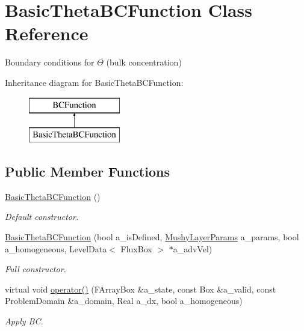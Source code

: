\hypertarget{class_basic_theta_b_c_function}{\section{Basic\-Theta\-B\-C\-Function Class Reference}
\label{class_basic_theta_b_c_function}
}


Boundary conditions for $ \Theta $ (bulk concentration)  


Inheritance diagram for Basic\-Theta\-B\-C\-Function\-:\begin{figure}[H]
\begin{center}
\leavevmode
\includegraphics[height=2.000000cm]{class_basic_theta_b_c_function}
\end{center}
\end{figure}
\subsection*{Public Member Functions}
\begin{DoxyCompactItemize}
\item 
\hypertarget{class_basic_theta_b_c_function_a53435ce6441cb3cdf5eec5d337f93a9a}{\hyperlink{class_basic_theta_b_c_function_a53435ce6441cb3cdf5eec5d337f93a9a}{Basic\-Theta\-B\-C\-Function} ()}\label{class_basic_theta_b_c_function_a53435ce6441cb3cdf5eec5d337f93a9a}

\begin{DoxyCompactList}\small\item\em Default constructor. \end{DoxyCompactList}\item 
\hypertarget{class_basic_theta_b_c_function_a1f6eb40bbe6eb9c8b3ddf7c5e17143b7}{\hyperlink{class_basic_theta_b_c_function_a1f6eb40bbe6eb9c8b3ddf7c5e17143b7}{Basic\-Theta\-B\-C\-Function} (bool a\-\_\-is\-Defined, \hyperlink{class_mushy_layer_params}{Mushy\-Layer\-Params} a\-\_\-params, bool a\-\_\-homogeneous, Level\-Data$<$ Flux\-Box $>$ $\ast$a\-\_\-adv\-Vel)}\label{class_basic_theta_b_c_function_a1f6eb40bbe6eb9c8b3ddf7c5e17143b7}

\begin{DoxyCompactList}\small\item\em Full constructor. \end{DoxyCompactList}\item 
\hypertarget{class_basic_theta_b_c_function_a7dce5ec23fd3b7cb9bcbfa07b21589aa}{virtual void \hyperlink{class_basic_theta_b_c_function_a7dce5ec23fd3b7cb9bcbfa07b21589aa}{operator()} (F\-Array\-Box \&a\-\_\-state, const Box \&a\-\_\-valid, const Problem\-Domain \&a\-\_\-domain, Real a\-\_\-dx, bool a\-\_\-homogeneous)}\label{class_basic_theta_b_c_function_a7dce5ec23fd3b7cb9bcbfa07b21589aa}

\begin{DoxyCompactList}\small\item\em Apply B\-C. \end{DoxyCompactList}\end{DoxyCompactItemize}
